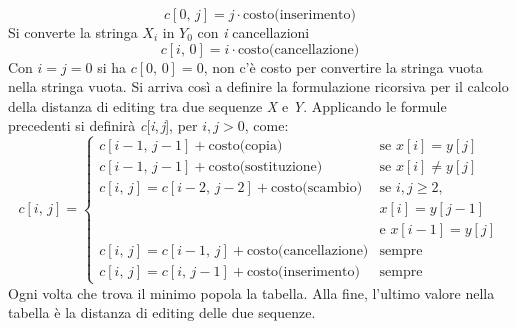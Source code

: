 \documentclass[10pt, a4paper]{report}
\begin{document}
\begin{equation*}
c[0,\,j] = j \cdot \text{costo(inserimento)}
\end{equation*}
Si converte la stringa $X_i$ in $Y_0$ con \textit{i} cancellazioni
\begin{equation*}
c[i,\,0] = i \cdot \text{costo(cancellazione)}
\end{equation*}
Con $i = j = 0$ si ha $c[0,\,0] = 0$, non c'è costo per convertire la stringa vuota nella stringa vuota. Si arriva così a definire la formulazione ricorsiva per il calcolo della distanza di editing tra due sequenze \textit{X} e \textit{Y}. Applicando le formule precedenti si definirà \textit{c}[\textit{i},\,\textit{j}], per $i,j > 0$, come:
\begin{equation*}
c[i,\,j] = \left\{
\begin{array}{ll}
c[i - 1,\,j - 1] + \text{costo(copia)} &\text{se } x[i] = y[j]\\
c[i - 1,\,j - 1] + \text{costo(sostituzione)} &\text{se } x[i] \neq y[j]\\
c[i,\,j] = c[i - 2,\,j - 2] + \text{costo(scambio)} &\text{se } i,j \geq 2,\\
&x[i] = y[j-1]\\
&\text{e }x[i-1] = y[j]\\
c[i,\,j] = c[i - 1,\,j] + \text{costo(cancellazione)} &\text{sempre}\\
c[i,\,j] = c[i,\,j - 1] + \text{costo(inserimento)} &\text{sempre}
\end{array}
\right.
\end{equation*}
Ogni volta che trova il minimo popola la tabella. Alla fine, l'ultimo valore nella tabella è la distanza di editing delle due sequenze.
\end{document}
